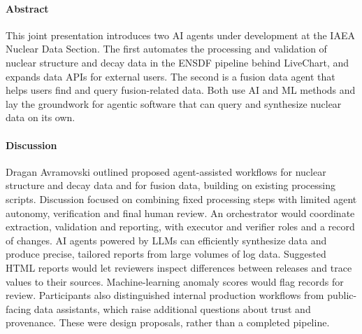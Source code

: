 \paragraph{Abstract}
This joint presentation introduces two AI agents under development at the IAEA Nuclear Data Section. The first automates the processing and validation of nuclear structure and decay data in the ENSDF\cite{ENSDF_Manual} pipeline behind LiveChart\cite{livechart}, and expands data APIs for external users. The second is a fusion data agent that helps users find and query fusion-related data. Both use AI and ML methods and lay the groundwork for agentic software that can query and synthesize nuclear data on its own.
\mbox{}\par

\paragraph{Discussion}
Dragan Avramovski outlined proposed agent-assisted workflows for nuclear structure and decay data and for fusion data, building on existing processing scripts. Discussion focused on combining fixed processing steps with limited agent autonomy, verification and final human review. An orchestrator would coordinate extraction, validation and reporting, with executor and verifier roles and a record of changes. AI agents powered by LLMs can efficiently synthesize data and produce precise, tailored reports from large volumes of log data. Suggested HTML reports would let reviewers inspect differences between releases and trace values to their sources. Machine-learning anomaly scores would flag records for review. Participants also distinguished internal production workflows from public-facing data assistants, which raise additional questions about trust and provenance. These were design proposals, rather than a completed pipeline.
